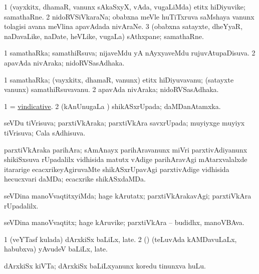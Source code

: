 \bentry
{} 
\gl{\nA}
\expl{}
\bmng
\bnum
\num{1} (vayxkitx, dhamaR, \mo vanunx sAkaSxyX, vAda, \mo vugaLiMda) etitx hiDiyuvike; samathaRne. 
\num{2} nidoRVSiVkaraNa; obabxna meVle huTiTxruva saMshaya \mo vanunx tolagisi avana meVlina apavAdada nivAraNe. 
\num{3} (obabxna satayxte, dheYyaR, naDavaLike, naDate, heVLike, \mo vugaLa) sAthxpane; samathaRne. 
\enum
\emng
\eentry

\bentry
{} 
\gl{\gu}
\expl{}
\bmng
\bnum
\num{1} samathaRka; samathiRsuva; nijaveMdu yA nAyxyaveMdu rujuvAtupaDisuva. 
\num{2} apavAda nivAraka; nidoRVSasAdhaka. 
\enum
\emng
\eentry

\bentry
{} 
\gl{\nA}
\expl{}
\bmng
\bnum
\num{1} samathaRka; (vayxkitx, dhamaR, \mo vanunx) etitx hiDiyuvavanu; (satayxte \mo vanunx) samathiRsuvavanu. 
\num{2} apavAda nivAraka; nidoRVSasAdhaka. 
\enum
\emng
\eentry

\bentry
{} 
\gl{\gu}
\expl{}
\bmng
\bnum
\num{1} = \hyperlink{vindicative}{vindicative}. 
\num{2} (kAnUnugaLa \vi) shikASxrUpada; daMDanAtamxka. 
\enum
\emng
\eentry

\bentry
{} 
\gl{\gu}
\expl{}
\bmng
 seVDu tiVrisuva; parxtiVkAraka; parxtiVkAra savxrUpada; muyiyxge muyiyx tiVrisuva; Cala sAdhisuva. 
\emng
\eentry

\bentry
{}
\gl{\nA}
\expl{}
\bmng
 parxtiVkAraka parihAra; sAmAnayx parihAravanunx miVri parxtivAdiyanunx shikiSxsuva rUpadalilx vidhisida matutx vAdige parihAravAgi mAtarxvalalxde itararige ecacxrikeyAgiruvaMte shikASxrUpavAgi parxtivAdige vidhisida hecucxvari daMDa; ecacxrike shikASxdaMDa. 
\emng
\eentry

\bentry
{} 
\gl{\kirxvi}
\expl{}
\bmng
 seVDina manoVvaqtitxyiMda; hage kArutatx; parxtiVkArakavAgi; parxtiVkAra rUpadalilx. 
\emng
\eentry

\bentry
{} 
\gl{\nA}
\expl{}
\bmng
 seVDina manoVvaqtitx; hage kAruvike; parxtiVkAra -- budidhx, manoVBAva. 
\emng
\eentry

\bentry
{} 
\gl{\nA}
\expl{}
\bmng
\bnum
\num{1} (veYTasf kulada) dArxkiSx baLiLx, late. 
\num{2} (\ame) (teLuvAda kAMDavuLaLx, habubxva) yAvudeV baLiLx, late. 
\enum
\emng
\eentry

\bentry
{} 
\gl{\nA}
\expl{}
\bmng
 dArxkiSx kiVTa; dArxkiSx baLiLxyanunx koredu tinunxva huLu. 
\emng
\eentry

